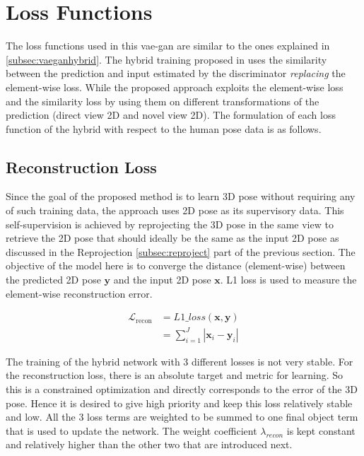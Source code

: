 \section{Loss Functions}
\label{sec:loss_fn}
The loss functions used in this \ac{vae}-\ac{gan} are similar to the ones explained in \ref{subsec:vaeganhybrid}. The hybrid training proposed in \cite{autoencoding_beyond_pixels} uses the similarity between the prediction and input estimated by the discriminator \textit{replacing} the element-wise loss. While the proposed approach exploits the element-wise loss and the similarity loss by using them on different transformations of the prediction (direct view 2D and novel view 2D). The formulation of each loss function of the hybrid with respect to the human pose data is as follows.

\subsection{Reconstruction Loss}
Since the goal of the proposed method is to learn 3D pose without requiring any of such training data, the approach uses 2D pose as its supervisory data. This self-supervision is achieved by reprojecting the 3D pose in the same view to retrieve the 2D pose that should ideally be the same as the input 2D pose as discussed in the Reprojection \ref{subsec:reproject} part of the previous section. The objective of the model here is to converge the distance (element-wise) between the predicted 2D pose $\textbf{y}$ and the input 2D pose $\textbf{x}$. L1 loss is used to measure the element-wise reconstruction error.

\begin{equation} \label{eqn:loss_recon}
    \begin{split}
        \mathcal{L}_{\text {recon}}  & = L1\_loss(\textbf{x}, \textbf{y}) \\
        & = \sum_{i=1}^J |\textbf{x}_i - \textbf{y}_i|
    \end{split}
\end{equation}

The training of the hybrid network with 3 different losses is not very stable. For the reconstruction loss, there is an absolute target and metric for learning. So this is a constrained optimization and directly corresponds to the error of the 3D pose. Hence it is desired to give high priority and keep this loss relatively stable and low. All the 3 loss terms are weighted to be summed to one final object term that is used to update the network. The weight coefficient $\lambda_{recon}$ is kept constant and relatively higher than the other two that are introduced next.


